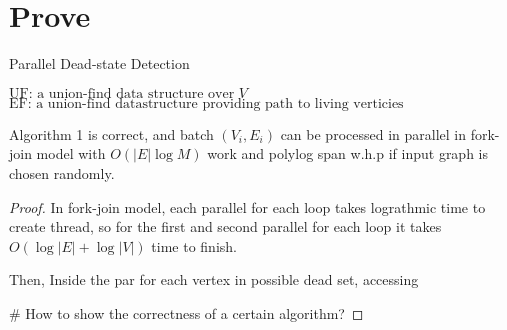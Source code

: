 \section{Prove}
\begin{algorithm}[H]
    \caption{Parallel Dead-state Detection}
    $\mbox{UF: a union-find data structure over }V$ \\
    $\mbox{EF: a union-find datastructure providing path to living verticies}$ \\
\end{algorithm}
\begin{theorem}
    Algorithm 1 is correct, and batch $(V_i, E_i)$ can be processed in parallel in 
    fork-join model with $O(|E|\log M)$ work and polylog span w.h.p if input graph is chosen randomly. 
\end{theorem}

\begin{proof}
    In fork-join model, each parallel for each loop takes lograthmic time to create thread, so for the first and second parallel
    for each loop it takes $O(\log |E|+\log|V|)$ time to finish.

    Then, Inside the par for each vertex in possible dead set, accessing

    # How to show the correctness of a certain algorithm?
\end{proof}
